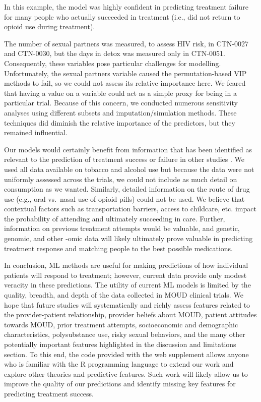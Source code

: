 \documentclass[
  number,
  preprint,
  3p,
  onecolumn]{elsarticle}
\begin{document}
In this example, the model was highly confident in predicting treatment
failure for many people who actually succeeded in treatment (i.e., did
not return to opioid use during treatment).

The number of sexual partners was measured, to assess HIV risk, in
CTN-0027 and CTN-0030, but the days in detox was measured only in
CTN-0051. Consequently, these variables pose particular challenges for
modelling. Unfortunately, the sexual partners variable caused the
permutation-based VIP methods to fail, so we could not assess its
relative importance here. We feared that having a value on a variable
could act as a simple proxy for being in a particular trial. Because of
this concern, we conducted numerous sensitivity analyses using different
subsets and imputation/simulation methods. These techniques did diminish
the relative importance of the predictors, but they remained
influential.

Our models would certainly benefit from information that has been
identified as relevant to the prediction of treatment success or failure
in other studies
\citep{hser1997, biondi2022, pretreat1981, mclellan_increased_1983, comptoniii2003, mclellan1983}.
We used all data available on tobacco and alcohol use but because the
data were not uniformly assessed across the trials, we could not include
as much detail on consumption as we wanted. Similarly, detailed
information on the route of drug use (e.g., oral vs.~nasal use of opioid
pills) could not be used. We believe that contextual factors such as
transportation barriers, access to childcare, etc. impact the
probability of attending and ultimately succeeding in care. Further,
information on previous treatment attempts would be valuable, and
genetic, genomic, and other -omic data will likely ultimately prove
valuable in predicting treatment response and matching people to the
best possible medications.

In conclusion, ML methods are useful for making predictions of how
individual patients will respond to treatment; however, current data
provide only modest veracity in these predictions. The utility of
current ML models is limited by the quality, breadth, and depth of the
data collected in MOUD clinical trials. We hope that future studies will
systematically and richly assess features related to the
provider-patient relationship, provider beliefs about MOUD, patient
attitudes towards MOUD, prior treatment attempts, socioeconomic and
demographic characteristics, polysubstance use, risky sexual behaviors,
and the many other potentially important features highlighted in the
discussion and limitations section. To this end, the code provided with
the web supplement \citep{balise_supplement_2025} allows anyone who is
familiar with the R programming language to extend our work and explore
other theories and predictive features. Such work will likely allow us
to improve the quality of our predictions and identify missing key
features for predicting treatment success.


\renewcommand\refname{References}

\end{document}
